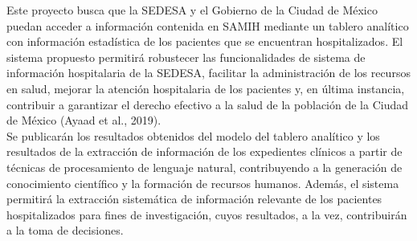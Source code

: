 Este proyecto busca que la SEDESA y el Gobierno de la Ciudad de México puedan acceder a información contenida en SAMIH mediante un tablero analítico con información estadística de los pacientes que se encuentran hospitalizados. El sistema propuesto permitirá robustecer las funcionalidades de sistema de información hospitalaria de la SEDESA, facilitar la administración de los recursos en salud, mejorar la atención hospitalaria de los pacientes y, en última instancia, contribuir a garantizar el derecho efectivo a la salud de la población de la Ciudad de México (Ayaad et al., 2019).\\

Se publicarán los resultados obtenidos del modelo del tablero analítico y los resultados de la extracción de información de los expedientes clínicos a partir de técnicas de procesamiento de lenguaje natural, contribuyendo a la generación de conocimiento científico y la formación de recursos humanos. Además, el sistema permitirá la extracción sistemática de información relevante de los pacientes hospitalizados para fines de investigación, cuyos resultados, a la vez, contribuirán a la toma de decisiones.
 
